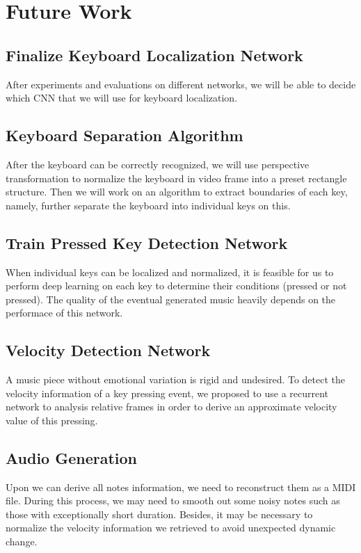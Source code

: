 \documentclass[10pt,twocolumn,letterpaper]{article}
\begin{document}
\section{Future Work}

\subsection{Finalize Keyboard Localization Network}

After experiments and evaluations on different networks, we will be able to decide which CNN that we will use for keyboard localization.

\subsection{Keyboard Separation Algorithm}

After the keyboard can be correctly recognized, we will use perspective transformation to normalize the keyboard in video frame into a preset rectangle structure. Then we will work on an algorithm to extract boundaries of each key, namely, further separate the keyboard into individual keys on this.

\subsection{Train Pressed Key Detection Network}

When individual keys can be localized and normalized, it is feasible for us to perform deep learning on each key to determine their conditions (pressed or not pressed). The quality of the eventual generated music heavily depends on the performace of this network.

\subsection{Velocity Detection Network}

A music piece without emotional variation is rigid and undesired. To detect the velocity information of a key pressing event, we proposed to use a recurrent network to analysis relative frames in order to derive an approximate velocity value of this pressing.

\subsection{Audio Generation}

Upon we can derive all notes information, we need to reconstruct them as a MIDI file. During this process, we may need to smooth out some noisy notes such as those with exceptionally short duration. Besides, it may be necessary to normalize the velocity information we retrieved to avoid unexpected dynamic change.
\end{document}
